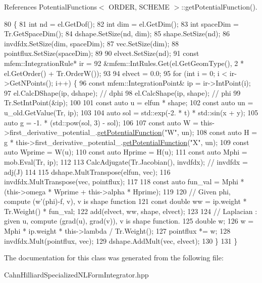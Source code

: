 References Potential\+Functions$<$ O\+R\+D\+E\+R, S\+C\+H\+E\+M\+E $>$\+::get\+Potential\+Function().


\begin{DoxyCode}
80                         \{
81   \textcolor{keywordtype}{int} nd = el.GetDof();
82   \textcolor{keywordtype}{int} dim = el.GetDim();
83   \textcolor{keywordtype}{int} spaceDim = Tr.GetSpaceDim();
84   dshape.SetSize(nd, dim);
85   shape.SetSize(nd);
86   invdfdx.SetSize(dim, spaceDim);
87   vec.SetSize(dim);
88   pointflux.SetSize(spaceDim);
89 
90   elvect.SetSize(nd);
91   \textcolor{keyword}{const} mfem::IntegrationRule* ir =
92       &mfem::IntRules.Get(el.GetGeomType(), 2 * el.GetOrder() + Tr.OrderW());
93 
94   elvect = 0.0;
95   \textcolor{keywordflow}{for} (\textcolor{keywordtype}{int} i = 0; i < ir->GetNPoints(); i++) \{
96     \textcolor{keyword}{const} mfem::IntegrationPoint& ip = ir->IntPoint(i);
97     el.CalcDShape(ip, dshape);  \textcolor{comment}{// dphi}
98     el.CalcShape(ip, shape);    \textcolor{comment}{// phi}
99     Tr.SetIntPoint(&ip);
100 
101     \textcolor{keyword}{const} \textcolor{keyword}{auto} u = elfun * shape;
102     \textcolor{keyword}{const} \textcolor{keyword}{auto} un = u\_old.GetValue(Tr, ip);
103 
104     \textcolor{keyword}{auto} sol = std::exp(-2. * t) * std::sin(x + y);
105     \textcolor{keyword}{auto} g = -1. * (std::pow(sol, 3) - sol);
106 
107     \textcolor{keyword}{const} \textcolor{keyword}{auto} W = this->first\_derivative\_potential\_.\hyperlink{classPotentialFunctions_a63a86cbadc57d531e0c0fa987ac9fea6}{getPotentialFunction}(\textcolor{stringliteral}{"W"}, un);
108     \textcolor{keyword}{const} \textcolor{keyword}{auto} H = g * this->first\_derivative\_potential\_.\hyperlink{classPotentialFunctions_a63a86cbadc57d531e0c0fa987ac9fea6}{getPotentialFunction}(\textcolor{stringliteral}{"X"}, un);
109     \textcolor{keyword}{const} \textcolor{keyword}{auto} Wprime = W(u);
110     \textcolor{keyword}{const} \textcolor{keyword}{auto} Hprime = H(u);
111     \textcolor{keyword}{const} \textcolor{keyword}{auto} Mphi = mob.Eval(Tr, ip);
112 
113     CalcAdjugate(Tr.Jacobian(), invdfdx);  \textcolor{comment}{// invdfdx = adj(J)}
114 
115     dshape.MultTranspose(elfun, vec);
116     invdfdx.MultTranspose(vec, pointflux);
117 
118     \textcolor{keyword}{const} \textcolor{keyword}{auto} fun\_val = Mphi * (this->omega * Wprime + this->alpha * Hprime);
119 
120     \textcolor{comment}{// Given phi, compute (w'(phi)-f, v), v is shape function}
121     \textcolor{keyword}{const} \textcolor{keywordtype}{double} ww = ip.weight * Tr.Weight() * fun\_val;
122     add(elvect, ww, shape, elvect);
123 
124     \textcolor{comment}{// Laplacian : given u, compute (grad(u), grad(v)), v is shape function.}
125     \textcolor{keywordtype}{double} w;
126     w = Mphi * ip.weight * this->lambda / Tr.Weight();
127     pointflux *= w;
128     invdfdx.Mult(pointflux, vec);
129     dshape.AddMult(vec, elvect);
130   \}
131 \}
\end{DoxyCode}


The documentation for this class was generated from the following file\+:\begin{DoxyCompactItemize}
\item 
Cahn\+Hilliard\+Specialized\+N\+L\+Form\+Integrator.\+hpp\end{DoxyCompactItemize}
